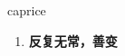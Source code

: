 
\begin{frame}
{\huge caprice}
\begin{center}
\begin{enumerate}\Large
  \item \textbf{反复无常，善变}
\end{enumerate}
\end{center}
\end{frame}
